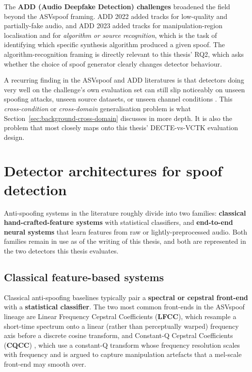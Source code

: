 The \textbf{ADD (Audio Deepfake Detection) challenges}
\cite{Yi2022_ADD} broadened the field beyond the ASVspoof framing.
ADD 2022 added tracks for low-quality and partially-fake audio,
and ADD 2023 \cite{Yi2023_ADD} added tracks for
manipulation-region localisation and for \emph{algorithm or source
recognition}, which is the task of identifying which specific
synthesis algorithm produced a given spoof. The
algorithm-recognition framing is directly relevant to this thesis'
RQ2, which asks whether the choice of spoof generator clearly
changes detector behaviour.

A recurring finding in the ASVspoof and ADD literatures is that
detectors doing very well on the challenge's own evaluation set
can still slip noticeably on unseen spoofing attacks, unseen
source datasets, or unseen channel conditions
\cite{Li2024_CrossDomainADD}. This \emph{cross-condition} or
\emph{cross-domain} generalisation problem is what
Section~\ref{sec:background-cross-domain} discusses in more depth.
It is also the problem that most closely maps onto this thesis'
DECTE-vs-VCTK evaluation design.


\section{Detector architectures for spoof detection}
\label{sec:background-detectors}

Anti-spoofing systems in the literature roughly divide into two
families: \textbf{classical hand-crafted-feature systems} with
statistical classifiers, and \textbf{end-to-end neural systems} that
learn features from raw or lightly-preprocessed audio. Both
families remain in use as of the writing of this thesis, and both
are represented in the two detectors this thesis evaluates.

\subsection{Classical feature-based systems}
\label{sec:background-detectors-classical}

Classical anti-spoofing baselines typically pair a \textbf{spectral or
cepstral front-end} with a \textbf{statistical classifier}. The two
most common front-ends in the ASVspoof lineage are Linear Frequency
Cepstral Coefficients (\textbf{LFCC}), which resample a short-time
spectrum onto a linear (rather than perceptually warped) frequency
axis before a discrete cosine transform, and Constant-Q Cepstral
Coefficients (\textbf{CQCC}) \cite{Todisco2017_CQCC}, which use a
constant-Q transform whose frequency resolution scales with
frequency and is argued to capture manipulation artefacts that a
mel-scale front-end may smooth over.

